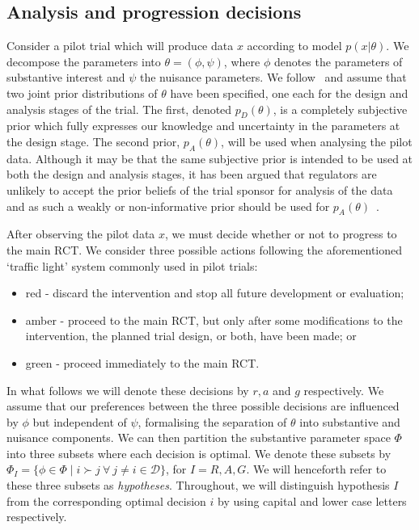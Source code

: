\documentclass[AMA,STIX1COL]{WileyNJD-v2}
\begin{document}
\subsection{Analysis and progression decisions}\label{sec:analysis}

Consider a pilot trial which will produce data $x$ according to model $p(x | \theta)$. We decompose the parameters into $\theta = (\phi, \psi)$, where $\phi$ denotes the parameters of substantive interest and $\psi$ the nuisance parameters. We follow~\cite{Wang2002} and assume that two joint prior distributions of $\theta$ have been specified, one each for the design and analysis stages of the trial. The first, denoted $p_{D}(\theta)$, is a completely subjective prior which fully expresses our knowledge and uncertainty in the parameters at the design stage. The second prior, $p_A(\theta)$, will be used when analysing the pilot data. Although it may be that the same subjective prior is intended to be used at both the design and analysis stages, it has been argued that regulators are unlikely to accept the prior beliefs of the trial sponsor for analysis of the data and as such a weakly or non-informative prior should be used for $p_A(\theta)$~\cite{OHagan2005, Walley2015}.

After observing the pilot data $x$, we must decide whether or not to progress to the main RCT. We consider three possible actions following the aforementioned `traffic light' system commonly used in pilot trials: 
\begin{itemize}
\item red - discard the intervention and stop all future development or evaluation; 
\item amber - proceed to the main RCT, but only after some modifications to the intervention, the planned trial design, or both, have been made; or
\item green - proceed immediately to the main RCT.
\end{itemize}
 
In what follows we will denote these decisions by $r, a$ and $g$ respectively. We assume that our preferences between the three possible decisions are influenced by $\phi$ but independent of $\psi$, formalising the separation of $\theta$ into substantive and nuisance components. We can then partition the substantive parameter space $\Phi$ into three subsets where each decision is optimal. We denote these subsets by $\Phi_{I} = \{ \phi \in \Phi \mid i \succ j ~\forall ~j \neq i \in \mathcal{D} \}$, for $I = R, A, G$. We will henceforth refer to these three subsets as \emph{hypotheses}. Throughout, we will distinguish hypothesis $I$ from the corresponding optimal decision $i$ by using capital and lower case letters respectively.
\end{document}
